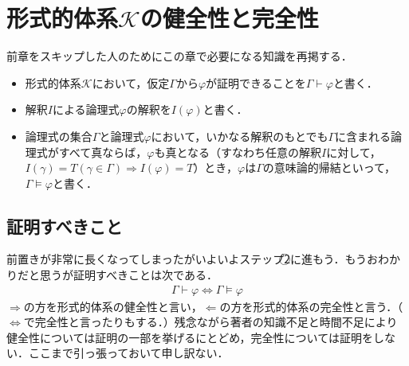 \documentclass[10pt,b5paper,papersize,dvipdfmx]{jsbook}
\newcommand\maru[1]{\textcircled{\scriptsize{}#1}}
\begin{document}
\section{形式的体系\texorpdfstring{$\mathcal K$}{K}の健全性と完全性}
前章をスキップした人のためにこの章で必要になる知識を再掲する．
\begin{itemize}
  \item 形式的体系$\mathcal K$において，仮定$\Gamma$から$\varphi$が証明できることを$\Gamma \vdash \varphi$と書く．
  \item 解釈$I$による論理式$\varphi$の解釈を$I(\varphi)$と書く．
  \item 論理式の集合$\Gamma$と論理式$\varphi$において，いかなる解釈のもとでも$\Gamma$に含まれる論理式がすべて真ならば，$\varphi$も真となる（すなわち任意の解釈$I$に対して，$I(\gamma)=T(\gamma \in \Gamma)\Rightarrow I(\varphi)=T$）とき，$\varphi$は$\Gamma$の意味論的帰結といって，$\Gamma \models \varphi$と書く．
\end{itemize}

\subsection{証明すべきこと}
前置きが非常に長くなってしまったがいよいよステップ\maru{2}に進もう．もうおわかりだと思うが証明すべきことは次である．
\begin{align}
  \Gamma \vdash \varphi \Leftrightarrow \Gamma \models \varphi
\end{align}
$\Rightarrow$の方を形式的体系の健全性と言い，$\Leftarrow$の方を形式的体系の完全性と言う．（$\Leftrightarrow$で完全性と言ったりもする．）残念ながら著者の知識不足と時間不足により健全性については証明の一部を挙げるにとどめ，完全性については証明をしない．ここまで引っ張っておいて申し訳ない．
\end{document}
